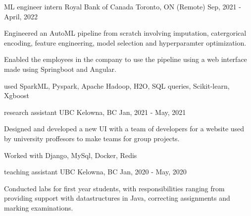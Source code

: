 

\begin{cventries}

  \cventry
    {ML engineer intern} %
    {Royal Bank of Canada} %
    {Toronto, ON (Remote)} %
    {Sep, 2021 - April, 2022} %
    {
      \begin{cvitems} %
        \item {Engineered an AutoML pipeline from scratch involving imputation, catergorical encoding, feature engineering, model selection and hyperparamter optimization.} 
        \item {Enabled the employees in the company to use the pipeline using a web interface made using Springboot and Angular.}
        \item {used SparkML, Pyspark, Apache Hadoop, H2O, SQL queries, Scikit-learn, Xgboost}
      \end{cvitems}
    }


  \cventry
    {research assistant} %
    {UBC} %
    {Kelowna, BC} %
    {Jan, 2021 - May, 2021} %
    {
      \begin{cvitems} %
        \item {Designed and developed a new UI with a team of developers for a website used by university proffesors to make teams for group projects.} 
        \item {Worked with Django, MySql, Docker, Redis}
      \end{cvitems}
    }

  \cventry
    {teaching assistant} %
    {UBC} %
    {Kelowna, BC} %
    {Jan, 2020 - May, 2020} %
    {
      \begin{cvitems} %
        \item {Conducted labs for first year students, with responsibilities ranging from providing support with datastructures in Java, correcting assignments and marking examinations.}
      \end{cvitems}
    }


\end{cventries}
